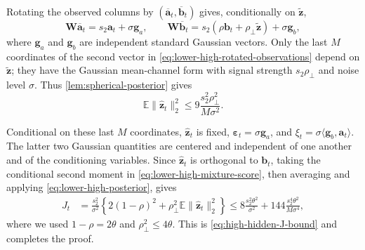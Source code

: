 \documentclass[11pt]{article}
\begin{document}
Rotating the observed columns by
$(\overline{\bm a}_t,\overline{\bm b}_t)$ gives, conditionally on
$\widetilde{\bm z}$,
\begin{equation}
  \bm W\overline{\bm a}_t
  =
  s_2\bm a_t+\sigma\bm g_a,
  \qquad
  \bm W\overline{\bm b}_t
  =
  s_2(\rho\bm b_t+\rho_\perp\widetilde{\bm z})+\sigma\bm g_b,
\label{eq:lower-high-rotated-observations}
\end{equation}
where $\bm g_a$ and $\bm g_b$ are independent standard Gaussian vectors.
Only the last $M$ coordinates of the second vector in
\cref{eq:lower-high-rotated-observations} depend on
$\widetilde{\bm z}$; they have the Gaussian mean-channel form with signal
strength $s_2\rho_\perp$ and noise level $\sigma$.  Thus
\cref{lem:spherical-posterior} gives
\begin{equation}
  \mathbb E\|\widehat{\bm z}_t\|_2^2
  \le
  9\frac{s_2^2\rho_\perp^2}{M\sigma^2}.
\label{eq:lower-high-posterior}
\end{equation}

Conditional on these last $M$ coordinates,
$\widehat{\bm z}_t$ is fixed,
$\bm\varepsilon_t=\sigma\bm g_a$, and
$\xi_t=\sigma\langle\bm g_b,\bm a_t\rangle$.  The latter two Gaussian
quantities are centered and independent of one another and of the
conditioning variables.  Since $\widehat{\bm z}_t$ is orthogonal to
$\bm b_t$, taking the conditional second moment in
\cref{eq:lower-high-mixture-score}, then averaging and applying
\cref{eq:lower-high-posterior}, gives
\begin{align*}
  J_t
  &=
  \frac{s_2^2}{\sigma^2}
  \left\{
    2(1-\rho)^2
    +
    \rho_\perp^2\mathbb E\|\widehat{\bm z}_t\|_2^2
  \right\} \le
  8\frac{s_2^2\theta^2}{\sigma^2}
  +
  144\frac{s_2^4\theta^2}{M\sigma^4},
\end{align*}
where we used $1-\rho=2\theta$ and $\rho_\perp^2\le4\theta$.
This is \cref{eq:high-hidden-J-bound} and completes the proof.
\end{document}
